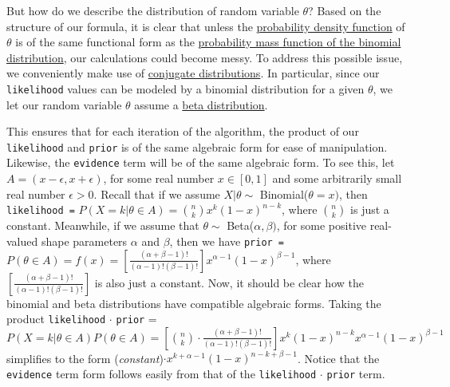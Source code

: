 But how do we describe the distribution of random variable $\theta$? Based on the structure of our formula, it is clear that unless the \href{https://en.wikipedia.org/wiki/Probability_density_function}{probability density function} of $\theta$ is of the same functional form as the \href{https://en.wikipedia.org/wiki/Binomial_distribution#Probability_mass_function}{probability mass function of the binomial distribution}, our calculations could become messy. To address this possible issue, we conveniently make use of \href{https://en.wikipedia.org/wiki/Conjugate_prior#Table_of_conjugate_distributions}{conjugate distributions}. In particular, since our \texttt{likelihood} values can be modeled by a binomial distribution for a given $\theta$, we let our random variable $\theta$ assume a \href{https://en.wikipedia.org/wiki/Beta_distribution}{beta distribution}.

This ensures that for each iteration of the algorithm, the product of our \texttt{likelihood} and \texttt{prior} is of the same algebraic form for ease of manipulation. Likewise, the \texttt{evidence} term will be of the same algebraic form. To see this, let $A = (x - \epsilon, x + \epsilon)$, for some real number $x \in [0,1]$ and some arbitrarily small real number $\epsilon > 0$. Recall that if we assume $X|\theta \sim$ Binomial($\theta = x)$, then \texttt{likelihood =} $P(X = k|\theta \in A) = \binom{n}{k}x^k(1-x)^{n-k}$, where $\binom{n}{k}$ is just a constant. Meanwhile, if we assume that $\theta \sim$ Beta($\alpha,\beta)$, for some positive real-valued shape parameters $\alpha$ and $\beta$, then we have \texttt{prior = }$P(\theta \in A) = f(x) = [\frac{(\alpha + \beta - 1)!}{(\alpha-1)!(\beta-1)!}]x^{\alpha-1}(1-x)^{\beta-1}$, where $[\frac{(\alpha + \beta - 1)!}{(\alpha-1)!(\beta-1)!}]$ is also just a constant. Now, it should be clear how the binomial and beta distributions have compatible algebraic forms. Taking the product \texttt{likelihood} $\cdot$ \texttt{prior} = $P(X = k|\theta \in A)P(\theta \in A) = [\binom{n}{k}\cdot\frac{(\alpha + \beta - 1)!}{(\alpha-1)!(\beta-1)!}]x^k(1-x)^{n-k}x^{\alpha-1}(1-x)^{\beta-1}$ simplifies to the form (\textit{constant})$\cdot x^{k+\alpha - 1}(1-x)^{n-k+\beta-1}$. Notice that the \texttt{evidence} term form follows easily from that of the \texttt{likelihood} $\cdot$ \texttt{prior} term.

